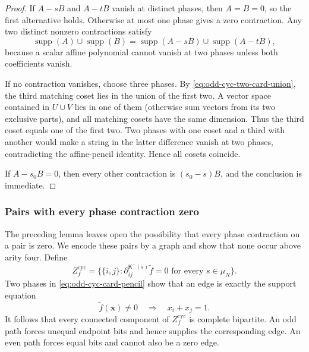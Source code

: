 \documentclass[11pt,letterpaper,onecolumn]{article}
\theoremstyle{plain}
\theoremstyle{definition}
\theoremstyle{remark}
\newcommand{\supp}{\operatorname{supp}}
\begin{document}
	\begin{proof}
		If \(A-sB\) and \(A-tB\) vanish at distinct phases, then \(A=B=0\),
		so the first alternative holds.  Otherwise at most one phase gives a zero
		contraction.  Any two distinct nonzero contractions satisfy
		\begin{equation}
			\supp(A)\cup\supp(B)
			=\supp(A-sB)\cup\supp(A-tB),
			\label{eq:odd-cyc-two-card-union}
		\end{equation}
		because a scalar affine polynomial cannot vanish at two phases unless both
		coefficients vanish.
		
		If no contraction vanishes, choose three phases.  By
		\cref{eq:odd-cyc-two-card-union}, the third matching coset lies in the union
		of the first two.  A vector space contained in \(U\cup V\) lies in one of
		them (otherwise sum vectors from its two exclusive parts), and all matching
		cosets have the same dimension.  Thus the third coset equals one of the first
		two.  Two phases with one coset and a third with another would make a string in
		the latter difference vanish at two phases, contradicting the affine-pencil
		identity.  Hence all cosets coincide.
		
		If \(A-s_0B=0\), then every other contraction is \((s_0-s)B\), and the conclusion
		is immediate.
	\end{proof}
	
	\subsubsection{Pairs with every phase contraction zero}
	\label{subsec:odd-cyc-zero-graph}
	
	The preceding lemma leaves open the possibility that every phase
	contraction on a pair is zero. We encode these pairs by a graph and show
	that none occur above arity four. Define
	\begin{equation*}
		Z_f^{\mathrm{cyc}}
		=
		\{\{i,j\}:\partial_{ij}^{\mathsf K^+(s)}\widetilde f=0\text{ for every }s\in\mu_N\}.
	\end{equation*}
	Two phases in \cref{eq:odd-cyc-card-pencil} show that an edge is exactly
	the support equation
	\begin{equation*}
		\widetilde f({\mathbf x})\ne0
		\quad\Longrightarrow\quad
		x_i+x_j=1.
	\end{equation*}
	It follows that every connected component of
	\(Z_f^{\mathrm{cyc}}\) is complete bipartite.  An odd path forces unequal
	endpoint bits and hence supplies the corresponding edge. An even path
	forces equal bits and cannot also be a zero edge.
	
\end{document}
